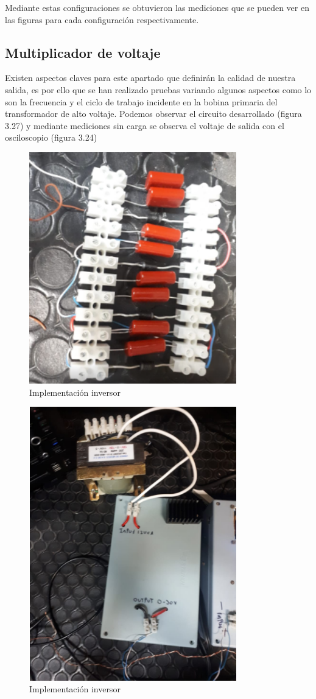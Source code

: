 Mediante estas configuraciones se obtuvieron las mediciones que se pueden ver en las figuras para cada configuración respectivamente. 

\subsection{Multiplicador de voltaje}

Existen aspectos claves para este apartado que definirán la calidad de nuestra salida, es por ello que se han realizado pruebas variando algunos aspectos como lo son la frecuencia y el ciclo de trabajo incidente en la bobina primaria del transformador de alto voltaje. Podemos observar el circuito desarrollado (figura 3.27) y mediante mediciones sin carga se observa el voltaje de salida con el osciloscopio (figura 3.24)

\begin{figure}[H]
\centering
\includegraphics[width=9cm]{Capitulo3/figs/fotomulti.png}
\caption{Implementación inversor}
\end{figure}

\begin{figure}[H]
\centering
\includegraphics[width=9cm]{Capitulo3/figs/fotofuente.png}
\caption{Implementación inversor}
\end{figure}
